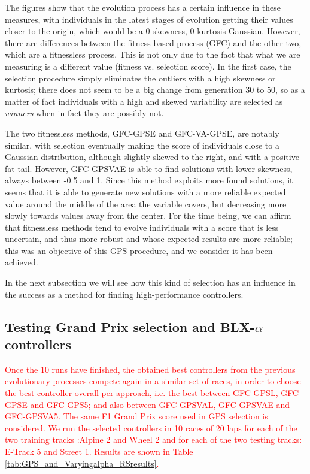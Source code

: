 \documentclass[10pt,journal,compsoc]{IEEEtran}
\begin{document}
The figures show that the evolution process has a certain influence in
these measures, with individuals in the latest stages of evolution
getting their values closer to the origin, which would be a 0-skewness, 0-kurtosis
Gaussian. However, there are differences between the fitness-based
process ({\sf GFC}) and the other two, which are a fitnessless process. This is not only due to the fact that what we are measuring is a different value (fitness vs. selection score). 
In the first case, the
selection procedure simply eliminates the outliers with a high
skewness or kurtosis; there does not seem to be a big change from
generation 30 to 50, so as a matter of fact individuals with a high
and skewed variability are selected as {\em winners} when in fact they
are possibly not.

The two fitnessless methods, {\sf GFC-GPSE} and {\sf GFC-VA-GPSE}, are
notably similar, with selection eventually making the score of  individuals
close to a Gaussian distribution, although slightly skewed to the
right, and with a positive fat tail. However, {\sf GFC-GPSVAE} is able
to find solutions with lower skewness, always between -0.5 and 1. Since
this method exploits more found solutions, it seems that it is able to
generate new solutions with a more reliable expected value around the
middle of the area the variable covers, but decreasing more slowly
towards values away from the center. For the time being,
we can affirm that fitnessless methods tend to evolve individuals
with a score that is less uncertain, and thus more robust and whose
expected results are more reliable; this was an objective of this GPS procedure, and we consider it has been achieved. 

In the next subsection we will see how this kind of selection has an influence in the success as a method for finding high-performance controllers.



\subsection{Testing Grand Prix selection and BLX-$\alpha$ controllers}

\textcolor{red}{
Once the 10 runs have finished, the obtained best controllers from the
previous evolutionary processes compete again in a similar set of races, in order to choose the best controller overall per approach, i.e. the best between {\sf GFC-GPSL}, {\sf GFC-GPSE} and {\sf GFC-GPS5}; and also between {\sf GFC-GPSVAL}, {\sf GFC-GPSVAE} and {\sf GFC-GPSVA5}. The same F1 Grand Prix score used in GPS selection is considered. We run the selected controllers in 10 races of 20 laps for each of the two training tracks :Alpine 2  and Wheel 2  and  for each of the two testing tracks: E-Track 5 and Street 1. Results are shown in Table \ref{tab:GPS_and_Varyingalpha_RSresults}.}
\end{document}
